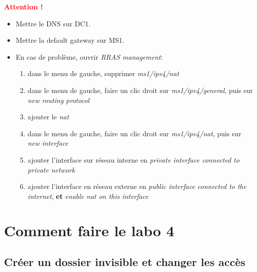 \documentclass[a4paper]{article}
\begin{document}
\textcolor{red}{\textbf{Attention !}}
\begin{itemize}
    \item Mettre le DNS sur DC1.
    \item Mettre la default gateway sur MS1.
    \item En cas de problème, ouvrir \textit{RRAS management}:
    \begin{enumerate}
        \item dans le menu de gauche, supprimer \textit{ms1/ipv4/nat}
        \item dans le menu de gauche, faire un clic droit sur \textit{ms1/ipv4/general}, puis sur \textit{new routing protocol}
        \item ajouter le \textit{nat}
        \item dans le menu de gauche, faire un clic droit sur \textit{ms1/ipv4/nat}, puis sur \textit{new interface}
        \item ajouter l'interface sur réseau interne en \textit{private interface connected to private network}
        \item ajouter l'interface en réseau externe en \textit{public interface connected to the internet}, \textbf{et} \textit{enable nat on this interface}
    \end{enumerate}
\end{itemize}















\section{Comment faire le labo 4}





\subsection{Créer un dossier invisible et changer les accès}
\end{document}
